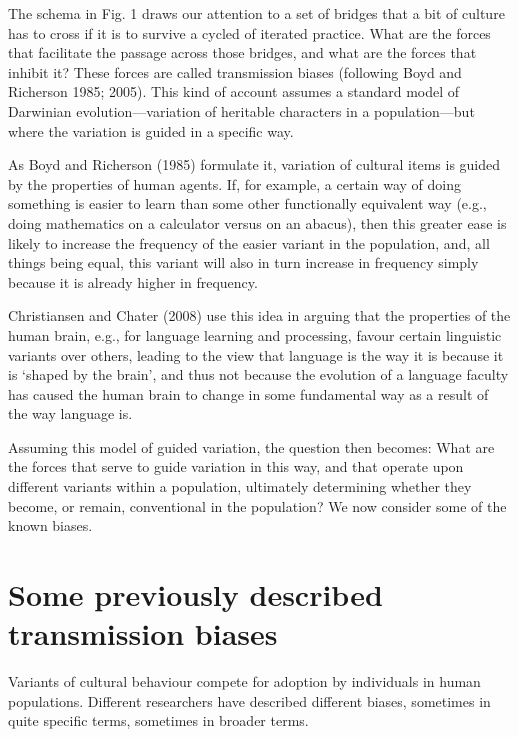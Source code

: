 The schema in Fig. 1 draws our attention to a set of bridges that a bit 
of culture has to cross if it is to survive a cycled of iterated 
practice. What are the forces that facilitate the passage across those 
bridges, and what are the forces that inhibit it? These forces are 
called transmission biases (following Boyd and Richerson 1985; 2005). 
This kind of account assumes a standard model of Darwinian 
evolution---variation of heritable characters in a population---but where 
the variation is guided in a specific way. 



As Boyd and Richerson (1985) formulate it, variation of cultural items 
is guided by the properties of human agents. If, for example, a certain 
way of doing something is easier to learn than some other functionally 
equivalent way (e.g., doing mathematics on a calculator versus on an abacus), 
then this greater ease is likely to increase the frequency of the easier 
variant in the population, and, all things being equal, this variant 
will also in turn increase in frequency simply because it is already 
higher in frequency. 



Christiansen and Chater (2008) use this idea in arguing that the 
properties of the human brain, e.g., for language learning and 
processing, favour certain linguistic variants over others, leading to 
the view that language is the way it is because it is \textquoteleft shaped by the 
brain', and thus not because the evolution of a language faculty has 
caused the human brain to change in some fundamental way as a result of 
the way language is. 



Assuming this model of guided variation, the question then becomes: What 
are the forces that serve to guide variation in this way, and that 
operate upon different variants within a population, ultimately 
determining whether they become, or remain, conventional in the 
population? We now consider some of the known biases.



\section{Some previously described transmission biases}


Variants of cultural behaviour compete for adoption by individuals in 
human populations. Different researchers have described different 
biases, sometimes in quite specific terms, sometimes in broader terms. 



